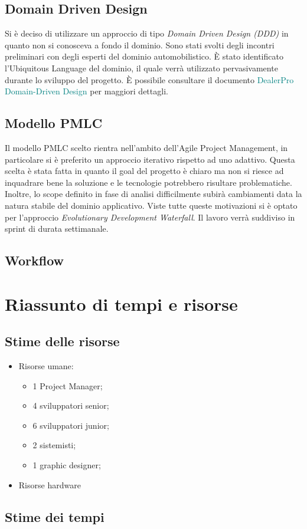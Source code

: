 \documentclass{article}
\begin{document}
  \subsection{Domain Driven Design}

  Si è deciso di utilizzare un approccio di tipo \emph{Domain Driven Design (DDD)} in quanto non si conosceva 
  a fondo il dominio. Sono stati svolti degli incontri preliminari con degli esperti del 
  dominio automobilistico. È stato identificato l’Ubiquitous Language del dominio, il quale verrà utilizzato 
  pervasivamente durante lo sviluppo del progetto. 
  È possibile consultare il documento \textcolor{teal}{DealerPro Domain-Driven Design} per maggiori dettagli.

  \subsection{Modello PMLC}

  Il modello PMLC scelto rientra nell'ambito dell'Agile Project Management, in particolare si è preferito un  
    approccio iterativo rispetto ad uno adattivo. Questa scelta è stata fatta in quanto il goal del progetto
    è chiaro ma non si riesce ad inquadrare bene la soluzione e le tecnologie potrebbero risultare problematiche.
    Inoltre, lo scope definito in fase di analisi difficilmente subirà cambiamenti data la natura stabile 
    del dominio applicativo. Viste tutte queste motivazioni si è optato per l'approccio
    \emph{Evolutionary Development Waterfall}.
    Il lavoro verrà suddiviso in sprint di durata settimanale.
  \subsection{Workflow}

  \newpage
  \section{Riassunto di tempi e risorse}

  \subsection{Stime delle risorse}
  \begin{itemize}
    \item Risorse umane:
    \begin{itemize}
      \item 1 Project Manager;
      \item 4 sviluppatori senior;
      \item 6 sviluppatori junior;
      \item 2 sistemisti;
      \item 1 graphic designer;
    \end{itemize}
    \item Risorse hardware
  \end{itemize}

  \subsection{Stime dei tempi}
\end{document}
